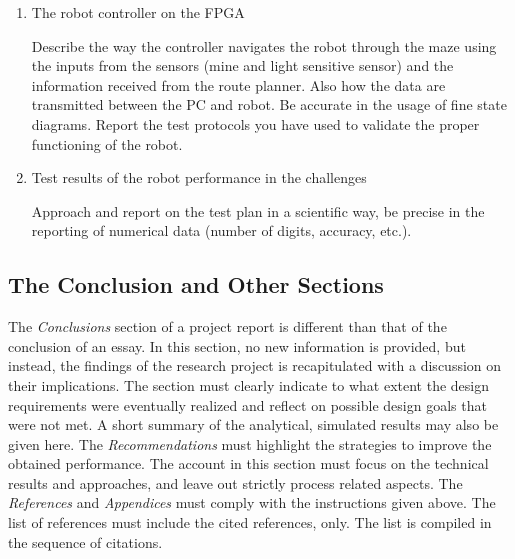 \begin{enumerate}
\item The robot controller on the FPGA  

  Describe the way the controller navigates the robot through the maze using the inputs from the sensors (mine and light sensitive sensor) and the information received from the route planner. Also how the data are transmitted between the PC and robot. Be accurate in the usage of fine state diagrams. Report the test protocols you have used to validate the proper functioning of the robot.

\item Test results of the robot performance in the challenges 

  Approach and report on the test plan in a scientific way, be precise in the reporting of numerical data (number of digits, accuracy, etc.).

 
\end{enumerate}


\subsection{The Conclusion and Other Sections}
  The \textit{Conclusions } section of a project report is different than that of the conclusion of an essay. In this section, no new information is provided, but instead, the findings of the research project is recapitulated with a discussion on their implications. The section must clearly indicate to what extent the design requirements were eventually realized and reflect on possible design goals that were not met. A short summary of the analytical, simulated results may also be given here. The \textit{Recommendations }must highlight the strategies to improve the obtained performance. The account in this section must focus on the technical results and approaches, and leave out strictly process related aspects. The \textit{References }and \textit{Appendices }must comply with the instructions given above. The list of references must include the cited references, only. The list is compiled in the sequence of citations.

  






